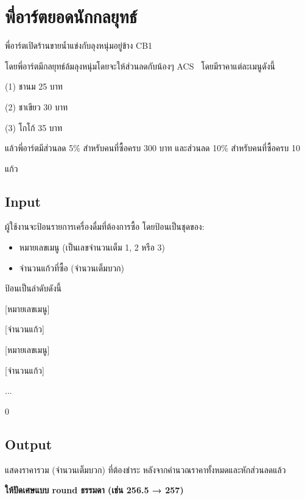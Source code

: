 \documentclass{article}
\begin{document}
\section*{พี่อาร์ตยอดนักกลยุทธ์}

พี่อาร์ตเปิดร้านขายน้ำแข่งกับลุงหนุ่มอยู่ข้าง CB1

โดยพี่อาร์ตมีกลยุทธ์ล้มลุงหนุ่มโดยจะให้ส่วนลดกับน้องๆ ACS~ โดยมีราคาแต่ละเมนูดังนี้



(1) ชานม 25 บาท



(2) ชาเขียว 30 บาท



(3) โกโก้ 35 บาท



แล้วพี่อาร์ตมีส่วนลด 5\% สำหรับคนที่ซื้อครบ 300 บาท และส่วนลด 10\% สำหรับคนที่ซื้อครบ 10

แก้ว



\subsection*{Input}
ผู้ใช้งานจะป้อนรายการเครื่องดื่มที่ต้องการซื้อ โดยป้อนเป็นชุดของ:



\begin{itemize}

\item

  หมายเลขเมนู (เป็นเลขจำนวนเต็ม 1, 2 หรือ 3)

\item

  จำนวนแก้วที่ซื้อ (จำนวนเต็มบวก)

\end{itemize}



ป้อนเป็นลำดับดังนี้



{[}หมายเลขเมนู{]}



{[}จำนวนแก้ว{]}



{[}หมายเลขเมนู{]}



{[}จำนวนแก้ว{]}



...



0



\subsection*{Output}
แสดงราคารวม (จำนวนเต็มบวก) ที่ต้องชำระ หลังจากคำนวณราคาทั้งหมดและหักส่วนลดแล้ว



\textbf{ให้ปัดเศษแบบ round ธรรมดา (เช่น 256.5 → 257)}
\end{document}
